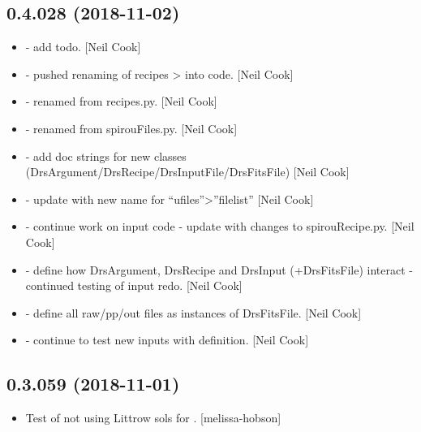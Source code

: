 \documentclass[a4paper,10pt,english]{report}
\begin{document}
\subsection{0.4.028 (2018-11-02)}
\label{\detokenize{misc/changelog:id272}}\begin{itemize}
\item {} 
 - add todo. {[}Neil Cook{]}

\item {} 
 - pushed renaming of recipes \textendash{}\textgreater{}  into
code. {[}Neil Cook{]}

\item {} 
 - renamed from recipes.py. {[}Neil Cook{]}

\item {} 
 - renamed from spirouFiles.py. {[}Neil Cook{]}

\item {} 
 - add doc strings for new classes
(DrsArgument/DrsRecipe/DrsInputFile/DrsFitsFile) {[}Neil Cook{]}

\item {} 
 - update with new name for “ufiles”\textendash{}\textgreater{}”filelist” {[}Neil
Cook{]}

\item {} 
 - continue work on input code - update with changes
to spirouRecipe.py. {[}Neil Cook{]}

\item {} 
 - define how DrsArgument, DrsRecipe and DrsInput
(+DrsFitsFile) interact - continued testing of input redo. {[}Neil Cook{]}

\item {} 
 - define all raw/pp/out files as instances of
DrsFitsFile. {[}Neil Cook{]}

\item {} 
 - continue to test new inputs with  definition.
{[}Neil Cook{]}

\end{itemize}


\subsection{0.3.059 (2018-11-01)}
\label{\detokenize{misc/changelog:id273}}\begin{itemize}
\item {} 
Test of not using Littrow sols for . {[}melissa-hobson{]}

\end{itemize}
\end{document}
